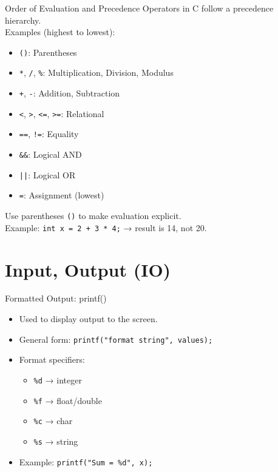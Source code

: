 \documentclass[12pt, aspectratio=169]{beamer}
\begin{document}
    \begin{frame}{Order of Evaluation and Precedence}
        Operators in C follow a precedence hierarchy.\\

        Examples (highest to lowest):
            \begin{itemize}
                \item \texttt{()}: Parentheses
                \item \texttt{*}, \texttt{/}, \texttt{\%}: Multiplication, Division, Modulus
                \item \texttt{+}, \texttt{-}: Addition, Subtraction
                \item \texttt{<}, \texttt{>}, \texttt{<=}, \texttt{>=}: Relational
                \item \texttt{==}, \texttt{!=}: Equality
                \item \texttt{\&\&}: Logical AND
                \item \texttt{||}: Logical OR
                \item \texttt{=}: Assignment (lowest)
            \end{itemize}
        Use parentheses \texttt{()} to make evaluation explicit.\\

        Example: \texttt{int x = 2 + 3 * 4;} → result is 14, not 20.
    \end{frame}


    \section{Input, Output (IO)}

    \begin{frame}{Formatted Output: printf()}
        \begin{itemize}
            \item Used to display output to the screen.
            \item General form: \texttt{printf("format string", values);}
            \item Format specifiers:
                \begin{itemize}
                    \item \texttt{\%d} → integer
                    \item \texttt{\%f} → float/double
                    \item \texttt{\%c} → char
                    \item \texttt{\%s} → string
                \end{itemize}
            \item Example: \texttt{printf("Sum = \%d", x);}
        \end{itemize}
    \end{frame}
\end{document}

